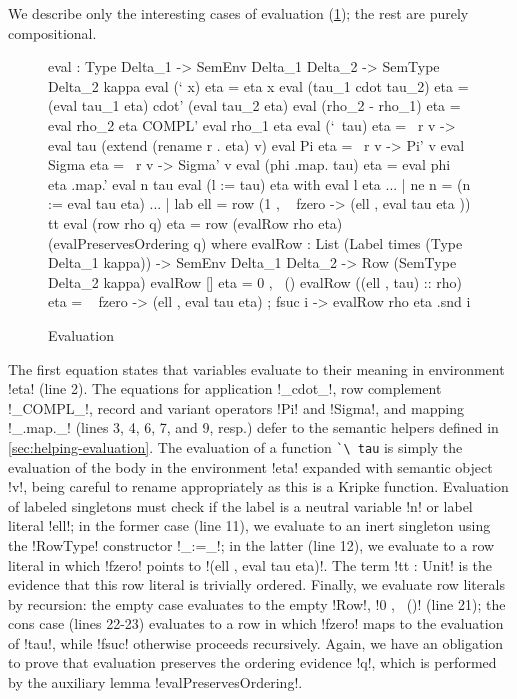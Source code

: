\documentclass[sigplan,10pt,anonymous,review]{acmart}\settopmatter{printfolios=true,printccs=false,printacmref=false}
\begin{document}
We describe only the interesting cases of evaluation (\cref{fig:evaluation}); the rest are purely compositional. 

\begin{figure}
\begin{agda}
eval : Type Delta_1 -> SemEnv Delta_1  Delta_2 -> SemType Delta_2  kappa
eval (` x) eta = eta x
eval (tau_1  cdot  tau_2) eta = (eval tau_1  eta) cdot' (eval tau_2  eta)
eval (rho_2 - rho_1) eta = eval rho_2 eta COMPL' eval rho_1  eta 
eval (`\ tau) eta = \ r v -> 
  eval tau (extend (rename r . eta) v)
eval Pi eta = \ r v -> Pi' v
eval Sigma eta = \ r v -> Sigma' v
eval (phi .map. tau) eta = eval phi eta .map.' eval n tau
eval (l := tau) eta with eval l eta 
... | ne n = (n := eval tau eta)
... | lab ell = row (1 , \ { 
        fzero -> (ell , eval tau eta )}) tt
eval (row rho q) eta = row 
  (evalRow rho eta) 
  (evalPreservesOrdering q)
where
  evalRow : List (Label times (Type Delta_1 kappa)) -> 
            SemEnv Delta_1  Delta_2 -> 
            Row (SemType Delta_2 kappa)
  evalRow [] eta = 0 , \ ()
  evalRow ((ell , tau) :: rho) eta = \ { 
    fzero  -> (ell , eval tau eta) ;
    fsuc i -> evalRow rho eta .snd i }
\end{agda}
\caption{Evaluation}
\label{fig:evaluation}
\end{figure}

The first equation states that variables evaluate to their meaning in environment !eta! (line 2). The equations for application !_cdot_!, row complement !_COMPL_!, record and variant operators !Pi! and !Sigma!, and mapping !_.map._! (lines 3, 4, 6, 7, and 9, resp.) defer to the semantic helpers defined in \cref{sec:helping-evaluation}. The evaluation of a function \lstinline{`\ tau} is simply the evaluation of the body in the environment !eta! expanded with semantic object !v!, being careful to rename appropriately as this is a Kripke function. Evaluation of labeled singletons must check if the label is a neutral variable !n! or label literal !ell!; in the former case (line 11), we evaluate to an inert singleton using the !RowType! constructor !_:=_!; in the latter (line 12), we evaluate to a row literal in which !fzero! points to !(ell , eval tau eta)!. The term !tt : Unit! is the evidence that this row literal is trivially ordered. Finally, we evaluate row literals by recursion: the empty case evaluates to the empty !Row!, !0 , \ ()! (line 21); the cons case (lines 22-23) evaluates to a row in which !fzero! maps to the evaluation of !tau!, while !fsuc! otherwise proceeds recursively. Again, we have an obligation to prove that evaluation preserves the ordering evidence !q!, which is performed by the auxiliary lemma !evalPreservesOrdering!.
\end{document}
